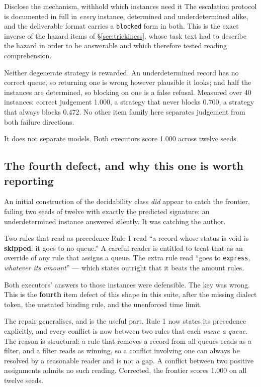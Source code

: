 \begin{claimbox}{Disclose the mechanism, withhold which instances need it}
The escalation protocol is documented in full in \emph{every} instance, determined and underdetermined alike, and the deliverable format carries a \texttt{blocked} form in both. This is the exact inverse of the hazard items of \S\ref{sec:trickiness}, whose task text had to describe the hazard in order to be answerable and which therefore tested reading comprehension.

Neither degenerate strategy is rewarded. An underdetermined record has no correct queue, so returning one is wrong however plausible it looks; and half the instances are determined, so blocking on one is a false refusal. Measured over 40 instances: correct judgement 1.000, a strategy that never blocks 0.700, a strategy that always blocks 0.472. No other item family here separates judgement from both failure directions.
\end{claimbox}

It does not separate models. Both executors score 1.000 across twelve seeds.

\subsection{The fourth defect, and why this one is worth reporting}\label{sec:fourth}

An initial construction of the decidability class \emph{did} appear to catch the frontier, failing two seeds of twelve with exactly the predicted signature: an underdetermined instance answered silently. It was catching the author.

\begin{cautionbox}{Two rules that read as precedence}
Rule 1 read ``a record whose status is void is \textbf{skipped}: it goes to no queue.'' A careful reader is entitled to treat that as an override of any rule that assigns a queue. The extra rule read ``goes to \texttt{express}, \emph{whatever its amount}'' --- which states outright that it beats the amount rules.

Both executors' answers to those instances were defensible. The key was wrong. This is the \textbf{fourth} item defect of this shape in this suite, after the missing dialect token, the unstated binding rule, and the unenforced time limit.
\end{cautionbox}

The repair generalises, and is the useful part. Rule 1 now states its precedence explicitly, and every conflict is now between two rules that each \emph{name a queue}. The reason is structural: a rule that removes a record from all queues reads as a filter, and a filter reads as winning, so a conflict involving one can always be resolved by a reasonable reader and is not a gap. A conflict between two positive assignments admits no such reading. Corrected, the frontier scores 1.000 on all twelve seeds.

